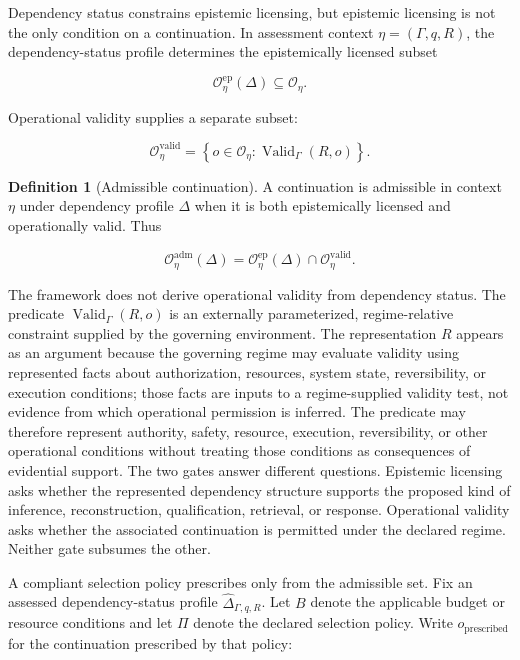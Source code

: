 \documentclass[11pt]{article}
\theoremstyle{definition}
\newtheorem{definition}[proposition]{Definition}
\theoremstyle{remark}
\begin{document}
Dependency status constrains epistemic licensing, but epistemic licensing is not the only condition on a continuation. In assessment context \(\eta=(\Gamma,q,R)\), the dependency-status profile determines the epistemically licensed subset

\[
\mathcal O^{\mathrm{ep}}_{\eta}(\Delta)
\subseteq
\mathcal O_{\eta}.
\]

Operational validity supplies a separate subset:

\[
\mathcal O^{\mathrm{valid}}_{\eta}
=
\left\{
o\in\mathcal O_{\eta}
:
\operatorname{Valid}_{\Gamma}(R,o)
\right\}.
\]

\begin{definition}[Admissible continuation]
\label{def:admissible-continuation}
A continuation is admissible in context \(\eta\) under dependency profile \(\Delta\) when it is both epistemically licensed and operationally valid. Thus

\[
\mathcal O^{\mathrm{adm}}_{\eta}(\Delta)
=
\mathcal O^{\mathrm{ep}}_{\eta}(\Delta)
\cap
\mathcal O^{\mathrm{valid}}_{\eta}.
\]
\end{definition}

The framework does not derive operational validity from dependency status. The predicate \(\operatorname{Valid}_{\Gamma}(R,o)\) is an externally parameterized, regime-relative constraint supplied by the governing environment. The representation \(R\) appears as an argument because the governing regime may evaluate validity using represented facts about authorization, resources, system state, reversibility, or execution conditions; those facts are inputs to a regime-supplied validity test, not evidence from which operational permission is inferred. The predicate may therefore represent authority, safety, resource, execution, reversibility, or other operational conditions without treating those conditions as consequences of evidential support. The two gates answer different questions. Epistemic licensing asks whether the represented dependency structure supports the proposed kind of inference, reconstruction, qualification, retrieval, or response. Operational validity asks whether the associated continuation is permitted under the declared regime. Neither gate subsumes the other.

A compliant selection policy prescribes only from the admissible set. Fix an assessed dependency-status profile \(\widehat{\Delta}_{\Gamma,q,R}\). Let \(B\) denote the applicable budget or resource conditions and let \(\Pi\) denote the declared selection policy. Write \(o_{\mathrm{prescribed}}\) for the continuation prescribed by that policy:
\end{document}
